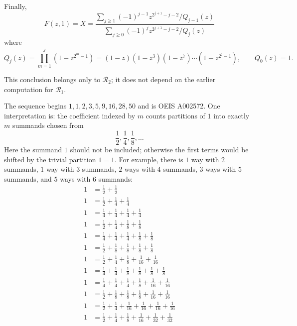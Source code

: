 Finally,
\begin{equation} \label{eq:III.22.7}
    F(z, 1) = X = \frac{\sum_{j \geq 1}(-1)^{j - 1}z^{2^{j + 1} - j - 2}/Q_{j - 1}(z)}{\sum_{j \geq 0}(-1)^{j}z^{2^{j + 1} - j - 2}/Q_{j}(z)}
\end{equation}
where
\begin{equation*}
    Q_j(z) = \prod_{m = 1}^{j}\left(1 - z^{2^m - 1}\right)
        = (1 - z)(1 - z^3)(1 - z^7)\cdots(1 - z^{2^j - 1}),
        \qquad Q_0(z)=1.
\end{equation*}

This conclusion belongs only to $\mathcal{R}_{2}$; it does not depend on the earlier computation for $\mathcal{R}_{1}$.

The sequence begins
$1,1,2,3,5,9,16,28,50$ and is OEIS A002572. One interpretation is:
the coefficient indexed by $m$ counts partitions of $1$ into exactly $m$ summands chosen from
\[
    \frac{1}{2},\frac{1}{4},\frac{1}{8},\ldots
\]
Here the summand $1$ should not be included; otherwise the first terms would be shifted by
the trivial partition $1=1$. For example, there is $1$ way with $2$ summands,
$1$ way with $3$ summands, $2$ ways with $4$ summands,
$3$ ways with $5$ summands, and $5$ ways with $6$ summands:
\begin{equation*}
    \begin{aligned}
        1 &= \frac{1}{2} + \frac{1}{2} \\[20pt]
        1 &= \frac{1}{2} + \frac{1}{4} + \frac{1}{4} \\[20pt]
        1 &= \frac{1}{4} + \frac{1}{4} + \frac{1}{4} + \frac{1}{4} \\
        1 &= \frac{1}{2} + \frac{1}{4} + \frac{1}{8} + \frac{1}{8} \\[20pt]
        1 &= \frac{1}{4} + \frac{1}{4} + \frac{1}{4} + \frac{1}{8} + \frac{1}{8} \\
        1 &= \frac{1}{2} + \frac{1}{8} + \frac{1}{8} + \frac{1}{8} + \frac{1}{8} \\
        1 &= \frac{1}{2} + \frac{1}{4} + \frac{1}{8} + \frac{1}{16} + \frac{1}{16} \\[20pt]
        1 &= \frac{1}{4} + \frac{1}{4} + \frac{1}{8} + \frac{1}{8} + \frac{1}{8} + \frac{1}{8} \\
        1 &= \frac{1}{4} + \frac{1}{4} + \frac{1}{4} + \frac{1}{8} + \frac{1}{16} + \frac{1}{16} \\
        1 &= \frac{1}{2} + \frac{1}{8} + \frac{1}{8} + \frac{1}{8} + \frac{1}{16} + \frac{1}{16} \\
        1 &= \frac{1}{2} + \frac{1}{4} + \frac{1}{16} + \frac{1}{16} + \frac{1}{16} + \frac{1}{16} \\
        1 &= \frac{1}{2} + \frac{1}{4} + \frac{1}{8} + \frac{1}{16} + \frac{1}{32} + \frac{1}{32}
    \end{aligned}
\end{equation*}

